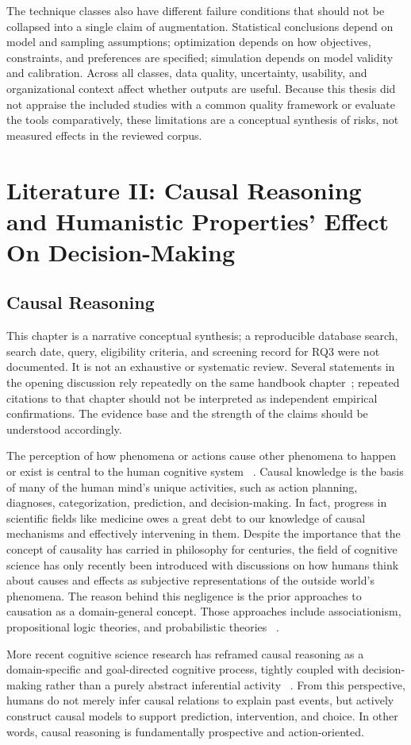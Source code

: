 \documentclass{sfuthesis}
\begin{document}
The technique classes also have different failure conditions that should not be collapsed into a single claim of augmentation. Statistical conclusions depend on model and sampling assumptions; optimization depends on how objectives, constraints, and preferences are specified; simulation depends on model validity and calibration. Across all classes, data quality, uncertainty, usability, and organizational context affect whether outputs are useful. Because this thesis did not appraise the included studies with a common quality framework or evaluate the tools comparatively, these limitations are a conceptual synthesis of risks, not measured effects in the reviewed corpus.\par

\chapter{Literature II: Causal Reasoning and Humanistic Properties’ Effect On Decision-Making}
\section{Causal Reasoning}
This chapter is a narrative conceptual synthesis; a reproducible database search, search date, query, eligibility criteria, and screening record for RQ3 were not documented. It is not an exhaustive or systematic review. Several statements in the opening discussion rely repeatedly on the same handbook chapter~\cite{waldmann_causal_2013}; repeated citations to that chapter should not be interpreted as independent empirical confirmations. The evidence base and the strength of the claims should be understood accordingly.\par
The perception of how phenomena or actions cause other phenomena to happen or exist is central to the human cognitive system ~\cite{sloman_causality_2015}. Causal knowledge is the basis of many of the human mind's unique activities, such as action planning, diagnoses, categorization, prediction, and decision-making. In fact, progress in scientific fields like medicine owes a great debt to our knowledge of causal mechanisms and effectively intervening in them. Despite the importance that the concept of causality has carried in philosophy for centuries, the field of cognitive science has only recently been introduced with discussions on how humans think about causes and effects as subjective representations of the outside world’s phenomena. The reason behind this negligence is the prior approaches to causation as a domain-general concept. Those approaches include associationism, propositional logic theories, and probabilistic theories ~\cite{waldmann_causal_2013}.\par
More recent cognitive science research has reframed causal reasoning as a domain-specific and goal-directed cognitive process, tightly coupled with decision-making rather than a purely abstract inferential activity ~\cite{waldmann_causal_2013}. From this perspective, humans do not merely infer causal relations to explain past events, but actively construct causal models to support prediction, intervention, and choice. In other words, causal reasoning is fundamentally prospective and action-oriented.
\end{document}
